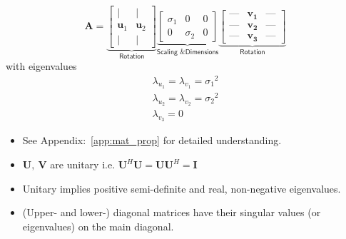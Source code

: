 \noindent\begin{equation*}
    \mathbf{A}=
    \underbrace{\begin{bmatrix}
            \vert        & \vert        \\
            \mathbf{u}_1 & \mathbf{u}_2 \\
            \vert        & \vert
        \end{bmatrix}}_{\textsf{Rotation}}
    \underbrace{\begin{bmatrix}
            \sigma_1 & 0        & 0 \\
            0        & \sigma_2 & 0
        \end{bmatrix}}_{\textsf{Scaling \& Dimensions}}
    \underbrace{\begin{bmatrix}
            \text{---} & \mathbf{v_1} & \text{---} \\
            \text{---} & \mathbf{v_2} & \text{---} \\
            \text{---} & \mathbf{v_3} & \text{---}
        \end{bmatrix}}_{\textsf{Rotation}}
\end{equation*}
with eigenvalues
\noindent\begin{gather*}
    \lambda_{u_1}=\lambda_{v_1}={\sigma_1}^2\\
    \lambda_{u_2}=\lambda_{v_2}={\sigma_2}^2\\
    \lambda_{v_3}=0
\end{gather*}


\begin{itemize}
    \item See Appendix:~\ref{app:mat_prop} for detailed understanding.
    \item $\mathbf{U},\:\mathbf{V}$ are unitary i.e. $\mathbf{U}^H \mathbf{U}=\mathbf{U}\mathbf{U}^H=\mathbf{I}$
    \item Unitary implies positive semi-definite and real, non-negative eigenvalues.
    \item (Upper- and lower-) diagonal matrices have their singular values (or eigenvalues) on the main diagonal.
\end{itemize}

